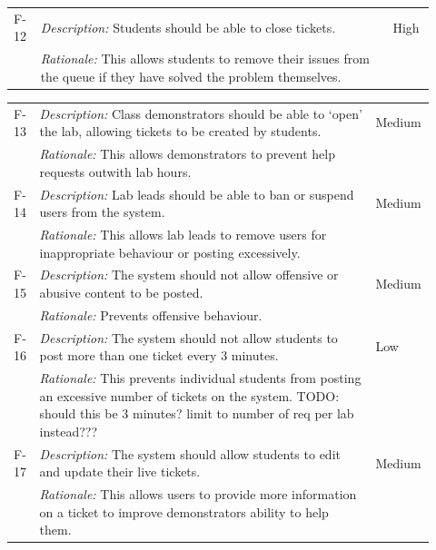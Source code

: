 \begin{table}[H]
\begin{tabular}{|p{0.05\linewidth} | p{0.78\linewidth} |p{0.09\linewidth}|}
  
      \hline\hline
 F-12 & \textit{Description:} Students should be able to close tickets. & High\\
  \cline{2-2}
  & \textit{Rationale:} This allows students to remove their issues from the queue if they have solved the problem themselves. & \\
\hline



  \end{tabular}
\end{table}

\begin{table}[H]
\small
\begin{tabular}{|p{0.05\linewidth} | p{0.78\linewidth} |p{0.09\linewidth}|}
  
          \hline
 F-13 & \textit{Description:} Class demonstrators should be able to `open' the lab, allowing tickets to be created by students. & Medium\\
  \cline{2-2}
  & \textit{Rationale:} This allows demonstrators to prevent help requests outwith lab hours. & \\

  
\hline\hline
 F-14 & \textit{Description:} Lab leads should be able to ban or suspend users from the system. & Medium\\
  \cline{2-2}
  & \textit{Rationale:} This allows lab leads to remove users for inappropriate behaviour or posting excessively. & \\
 
 \hline\hline
 F-15 & \textit{Description:} The system should not allow offensive or abusive content to be posted. & Medium\\
  \cline{2-2}
  & \textit{Rationale:} Prevents offensive behaviour. & \\
 
 \hline\hline
 F-16 & \textit{Description:} The system should not allow students to post more than one ticket every 3 minutes. & Low\\
  \cline{2-2}
  & \textit{Rationale:} This prevents individual students from posting an excessive number of tickets on the system. TODO: should this be 3 minutes? limit to number of req per lab instead??? & \\
 
  \hline\hline
 F-17 & \textit{Description:} The system should allow students to edit and update their live tickets. & Medium\\
  \cline{2-2}
  & \textit{Rationale:}  This allows users to provide more information on a ticket to improve demonstrators ability to help them. & \\
 

\end{tabular}
\end{table}

